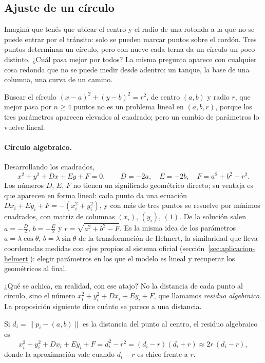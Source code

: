 \subsection{Ajuste de un círculo}\label{sec:cuatro-problemas-circulo}

Imaginá que tenés que ubicar el centro y el radio de una rotonda a la que no se puede entrar
por el tránsito: solo se pueden marcar puntos sobre el cordón. Tres puntos determinan un
círculo, pero con nueve cada terna da un círculo un poco distinto. ¿Cuál pasa mejor por
todos? La misma pregunta aparece con cualquier cosa redonda que no se puede medir desde
adentro: un tanque, la base de una columna, una curva de un camino.

Buscar el círculo \((x-a)^2+(y-b)^2=r^2\), de centro \((a,b)\) y radio \(r\), que mejor pasa
por \(n\ge4\) puntos no es un problema lineal en \((a,b,r)\), porque los tres parámetros
aparecen elevados al cuadrado; pero un cambio de parámetros lo vuelve lineal.

\paragraph{Círculo algebraico.} Desarrollando los cuadrados,
\[
  x^2+y^2+Dx+Ey+F=0,\qquad D=-2a,\quad E=-2b,\quad F=a^2+b^2-r^2 .
\]
Los números \(D\), \(E\), \(F\) no tienen un significado geométrico directo; su ventaja es que
aparecen en forma lineal: cada punto da una ecuación
\(Dx_i+Ey_i+F=-(x_i^2+y_i^2)\), y con más de tres puntos se resuelve por mínimos cuadrados,
con matriz de columnas \((x_i)\), \((y_i)\), \((1)\). De la solución salen \(a=-\tfrac D2\),
\(b=-\tfrac E2\) y \(r=\sqrt{a^2+b^2-F}\).
Es la misma idea de los parámetros \(a=\lambda\cos\theta\), \(b=\lambda\sin\theta\) de la
transformación de Helmert, la similaridad que lleva coordenadas medidas con ejes propios al
sistema oficial (sección~\ref{sec:aplicacion-helmert}): elegir parámetros en los que el modelo
es lineal y recuperar los geométricos al final.

¿Qué se achica, en realidad, con ese atajo? No la distancia de cada punto al círculo, sino el
número \(x_i^2+y_i^2+Dx_i+Ey_i+F\), que llamamos \emph{residuo algebraico}. La proposición
siguiente dice cuánto se parece a una distancia.

\begin{proposicion}\label{prop:cp-residuo-algebraico}
Si \(d_i=\lVert p_i-(a,b)\rVert\) es la distancia del punto al centro, el residuo
algebraico es
\[
  x_i^2+y_i^2+Dx_i+Ey_i+F=d_i^2-r^2=(d_i-r)(d_i+r)\approx 2r\,(d_i-r),
\]
donde la aproximación vale cuando \(d_i-r\) es chico frente a \(r\).
\end{proposicion}

